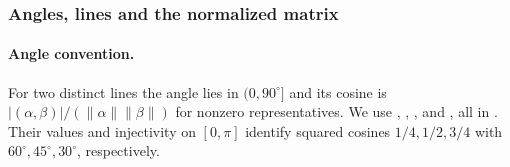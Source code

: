 \subsubsection{Angles, lines and the normalized matrix}

\paragraph{Angle convention.}\label{facts:rem-angles}
\begingroup\raggedright
For two distinct lines the angle lies in $(0,90^\circ]$ and its cosine
is $|(\alpha,\beta)|/(\|\alpha\|\|\beta\|)$ for nonzero representatives.
We use , ,
, and , all in
.
Their values and injectivity on $[0,\pi]$ identify squared cosines
$1/4,1/2,3/4$ with $60^\circ,45^\circ,30^\circ$, respectively.
\par\endgroup

